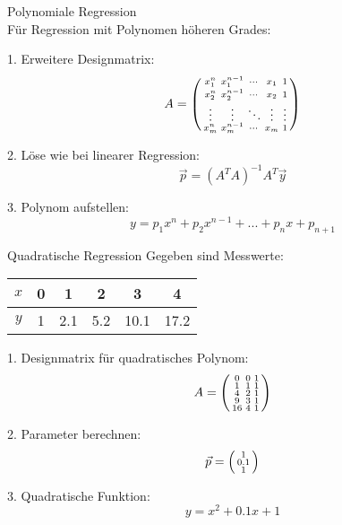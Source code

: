 \begin{KR}{Polynomiale Regression}\\
Für Regression mit Polynomen höheren Grades:

1. Erweitere Designmatrix:
   $$A = \begin{psmallmatrix}
   x_1^n & x_1^{n-1} & \cdots & x_1 & 1 \\
   x_2^n & x_2^{n-1} & \cdots & x_2 & 1 \\
   \vdots & \vdots & \ddots & \vdots & \vdots \\
   x_m^n & x_m^{n-1} & \cdots & x_m & 1
   \end{psmallmatrix}$$

2. Löse wie bei linearer Regression:
   $$\vec{p} = (A^T A)^{-1} A^T \vec{y}$$

3. Polynom aufstellen:
   $$y = p_1x^n + p_2x^{n-1} + ... + p_nx + p_{n+1}$$
\end{KR}

\begin{example2}{Quadratische Regression}
Gegeben sind Messwerte:
\begin{center}
\begin{tabular}{|c|c|c|c|c|c|}
\hline
$x$ & 0 & 1 & 2 & 3 & 4 \\
\hline
$y$ & 1 & 2.1 & 5.2 & 10.1 & 17.2 \\
\hline
\end{tabular}
\end{center}

1. Designmatrix für quadratisches Polynom:
   $$A = \begin{psmallmatrix}
   0 & 0 & 1 \\
   1 & 1 & 1 \\
   4 & 2 & 1 \\
   9 & 3 & 1 \\
   16 & 4 & 1
   \end{psmallmatrix}$$

2. Parameter berechnen:
   $$\vec{p} = \begin{psmallmatrix} 1 \\ 0.1 \\ 1 \end{psmallmatrix}$$

3. Quadratische Funktion:
   $$y = x^2 + 0.1x + 1$$
\end{example2}

